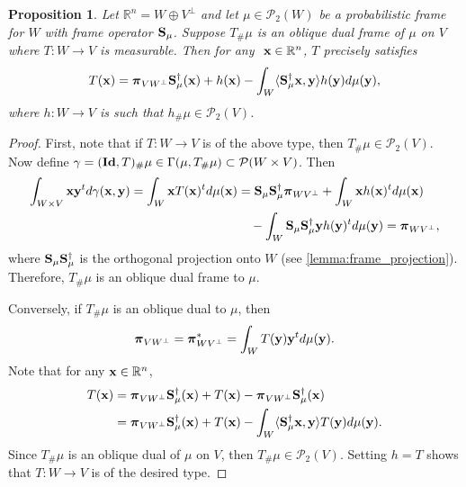 \documentclass{amsart}
\numberwithin{equation}{section}
\newcommand{\bpi}{{\boldsymbol{\pi}}}
\theoremstyle{plain}
\newtheorem{proposition}[theorem]{Proposition}
\theoremstyle{remark}
\theoremstyle{definition}
\begin{document}
\begin{proposition}\label{lemma:poblique_dual_equiv}
Let $\mathbb{R}^n = W \oplus V^\perp$ and let $\mu \in \mathcal{P}_2(W)$ be a probabilistic frame for $W$ with frame operator ${\bf S}_\mu$. 
 Suppose $T_\# \mu$ is an oblique dual frame of $\mu$ on $V$ where $T: W \rightarrow V$ is measurable.
Then for any $\ {\bf x} \in \mathbb{R}^n$, $T$ precisely satisfies 
   \begin{equation*}
        T({\bf x}) = \bpi_{VW^\perp}{\bf S}_\mu^{\dagger}({\bf x}) + h({\bf x}) - \int_{W} \langle {\bf S}_\mu^{\dagger}{\bf x}, {\bf y} \rangle h({\bf y}) d\mu({\bf y}),
      \end{equation*}
where $h: W \rightarrow V$ is such that $h_\#\mu \in \mathcal{P}_2(V)$.
\end{proposition}
\begin{proof}
    First, note that if $T: W \rightarrow V$ is of the above type, then $T_\# \mu \in \mathcal{P}_2(V)$. Now define $ \gamma = ({\bf Id}, T)_\#\mu \in \Gamma(\mu, T_\#\mu) \subset \mathcal{P}(W \times V)$. 
    Then 
    \begin{equation*}
    \begin{split}
        \int_{W \times V} {\bf x} {\bf y}^t d\gamma({\bf x, y})  = \int_{W} {\bf x} T({\bf x})^t d\mu({\bf x}) &=  {\bf S}_\mu{\bf S}_\mu^{\dagger} \bpi_{WV^\perp}+ \int_{W} {\bf x} h({\bf x})^t d\mu({\bf x}) \\
        &\quad -  \int_{W}   {\bf S}_\mu {\bf S}_\mu^{\dagger} {\bf y} h({\bf y})^t d\mu({\bf y}) = \bpi_{WV^\perp},
    \end{split}
    \end{equation*}
where ${\bf S}_\mu {\bf S}_\mu^{\dagger}$ is the orthogonal projection onto $W$ (see \cref{lemma:frame_projection}). Therefore, $T_\# \mu$ is an oblique dual frame to $\mu$. 

Conversely, if $T_\# \mu$ is an oblique dual to $\mu$, then 
   \begin{equation*}
      \bpi_{VW^\perp} = \bpi_{WV^\perp}^* = \int_{W }  T({\bf y}) {\bf y}^t d\mu({\bf y}).
    \end{equation*}
Note that for any ${\bf x} \in \mathbb{R}^n$, 
    \begin{equation*}
    \begin{split}
         T({\bf x}) 
         &= \bpi_{VW^\perp}{\bf S}_\mu^{\dagger}({\bf x}) + T({\bf x}) -  \bpi_{VW^\perp}{\bf S}_\mu^{\dagger}({\bf x}) \\
         &=\bpi_{VW^\perp}{\bf S}_\mu^{\dagger}({\bf x}) + T({\bf x}) - \int_{W }   \langle {\bf S}_\mu^{\dagger}{\bf x},  {\bf y} \rangle T({\bf y}) d\mu({\bf y}).
    \end{split}
    \end{equation*}
Since $T_\# \mu$ is an oblique dual of $\mu$ on $V$, then $T_\#\mu \in \mathcal{P}_2(V)$. Setting $h=T$ shows that $T: W \rightarrow V$ is of the desired type.
\end{proof}
\end{document}
